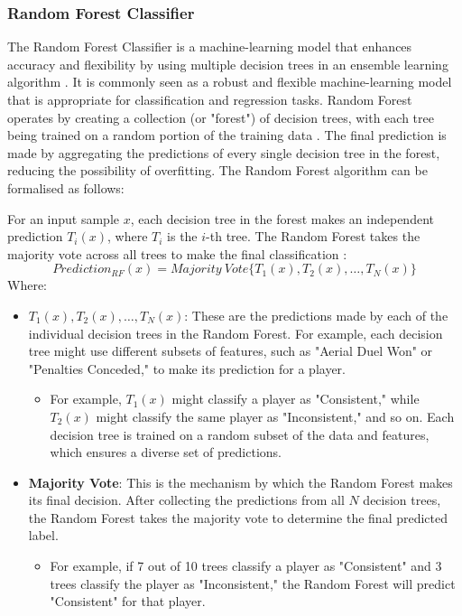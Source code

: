 \documentclass[12pt, a4paper,oneside]{book}
\numberwithin{equation}{section}
\begin{document}
\subsubsection{Random Forest Classifier}

The Random Forest Classifier is a machine-learning model that enhances accuracy and flexibility by using multiple decision trees in an ensemble learning algorithm \cite{zhou2012}. It is commonly seen as a robust and flexible machine-learning model that is appropriate for classification and regression tasks. Random Forest operates by creating a collection (or "forest") of decision trees, with each tree being trained on a random portion of the training data \cite{liaw2002}. The final prediction is made by aggregating the predictions of every single decision tree in the forest, reducing the possibility of overfitting. The Random Forest algorithm can be formalised as follows:

For an input sample \( x \), each decision tree in the forest makes an independent prediction \( T_i(x) \), where \( T_i \) is the \( i \)-th tree. The Random Forest takes the majority vote across all trees to make the final classification \cite{sruthi2024} \cite{zhou2012}:
\[Prediction_{RF}(x) = Majority\ Vote\{T_1(x), T_2(x), \dots, T_N(x)\}\]
Where:
\begin{itemize}
    \item \textbf{$T_1(x), T_2(x), \dots, T_N(x)$}: These are the predictions made by each of the individual decision trees in the Random Forest. For example, each decision tree might use different subsets of features, such as "Aerial Duel Won" or "Penalties Conceded," to make its prediction for a player.
    \begin{itemize}
        \item For example, $T_1(x)$ might classify a player as "Consistent," while $T_2(x)$ might classify the same player as "Inconsistent," and so on. Each decision tree is trained on a random subset of the data and features, which ensures a diverse set of predictions.
    \end{itemize}
    \item \textbf{Majority Vote}: This is the mechanism by which the Random Forest makes its final decision. After collecting the predictions from all $N$ decision trees, the Random Forest takes the majority vote to determine the final predicted label. 
    \begin{itemize}
        \item For example, if 7 out of 10 trees classify a player as "Consistent" and 3 trees classify the player as "Inconsistent," the Random Forest will predict "Consistent" for that player.
    \end{itemize}
\end{itemize}
\end{document}

